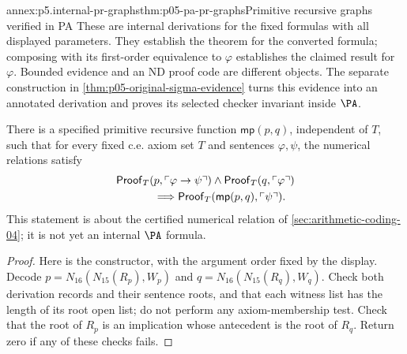 \begin{annexitem}{annex:p5.internal-pr-graphs}{thm:p05-pa-pr-graphs}{Primitive recursive graphs verified in PA}
These are internal derivations for the fixed formulas with all displayed
parameters.  They establish the theorem for the converted formula; composing
with its first-order equivalence to \(\varphi\) establishes the claimed
result for \(\varphi\). Bounded evidence and an ND proof code are
different objects. The separate construction in
\cref{thm:p05-original-sigma-evidence} turns this evidence into an annotated
derivation and proves its selected checker invariant inside \(\PA\).

\begin{annexlemma}
\label{thm:p05-numerical-mp-constructor}
There is a specified primitive recursive function \(\mathsf{mp}(p,q)\),
independent of \(T\), such that for every fixed c.e. axiom set \(T\)
and sentences \(\varphi,\psi\), the numerical relations satisfy
\[
\begin{split}
 &\mathsf{Proof}_T(p,\ulcorner\varphi\to\psi\urcorner)
       \land\mathsf{Proof}_T(q,\ulcorner\varphi\urcorner)\\
 &\hspace{12mm}\Longrightarrow
       \mathsf{Proof}_T(\mathsf{mp}(p,q),\ulcorner\psi\urcorner).
\end{split}
\]
This statement is about the certified numerical relation of
\cref{sec:arithmetic-coding-04}; it is not yet an internal \(\PA\) formula.
\end{annexlemma}
\begin{proof}
Here is the constructor, with the argument order fixed by the display.
Decode \(p=N_{16}(N_{15}(R_p),W_p)\) and
\(q=N_{16}(N_{15}(R_q),W_q)\).  Check both derivation records and their
sentence roots, and that each witness list has the length of its root open
list; do not perform any axiom-membership test.  Check that the root of
\(R_p\) is an implication whose antecedent is the root of \(R_q\).
Return zero if any of these checks fails.


\end{proof}
\end{annexitem}
